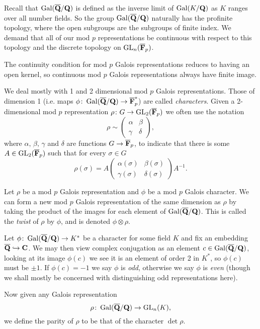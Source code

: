 \documentclass[a4paper,12pt]{article}
\begin{document}
Recall that $\operatorname{Gal}(\overline{\mathbf{Q}}/\mathbf{Q})$ is defined as the inverse limit of $\operatorname{Gal}(K/\mathbf{Q})$ as $K$ ranges over all number fields.
So the group $\operatorname{Gal}(\overline{\mathbf{Q}}/\mathbf{Q})$ naturally has the profinite topology, where the open subgroups are the subgroups of finite index.
We demand that all of our mod $p$ representations be continuous with respect to this topology and the discrete topology on $\operatorname{GL}_n(\overline{\mathbf{F}}_p)$.

\begin{rmk}\label{rmk:ctsfin}
The continuity condition for mod $p$ Galois representations reduces to having an open kernel, so continuous mod $p$ Galois representations always have finite image.
\end{rmk}

We deal mostly with 1 and 2 dimensional mod $p$ Galois representations.
Those of dimension 1 (i.e. maps $\phi\colon\operatorname{Gal}(\overline{\mathbf{Q}}/\mathbf{Q}) \to \overline{\mathbf{F}}_p^*$) are called \emph{characters}.
Given a 2-dimensional mod $p$ representation $\rho\colon G\to \operatorname{GL}_2(\overline{\mathbf{F}}_p)$ we often use the notation
\[
\rho \sim \begin{pmatrix}
\alpha & \beta \\
\gamma & \delta
\end{pmatrix},
\]
where $\alpha,\,\beta,\,\gamma$ and $\delta$ are functions $G \to \overline{\mathbf{F}}_p$, to indicate that there is some $A\in\operatorname{GL}_2(\overline{\mathbf{F}}_p)$ such that for every $\sigma\in G$
\[
\rho(\sigma) = A
 \begin{pmatrix}
\alpha(\sigma) & \beta(\sigma) \\
\gamma(\sigma) & \delta(\sigma)
\end{pmatrix}A^{-1}.
\]

\begin{defn}
Let $\rho$ be a mod $p$ Galois representation and $\phi$ be a mod $p$ Galois character.
We can form a new mod $p$ Galois representation of the same dimension as $\rho$ by taking the product of the images for each element of $\operatorname{Gal}(\overline{\mathbf{Q}}/\mathbf{Q})$.
This is called the \emph{twist} of $\rho$ by $\phi$, and is denoted $\phi\otimes \rho$.
\end{defn}

\begin{defn}
Let $\phi\colon\operatorname{Gal}(\overline{\mathbf{Q}}/\mathbf{Q}) \to K^*$ be a character for some field $K$ and fix an embedding $\overline{\mathbf{Q}}\hookrightarrow \mathbf{C}$.
We may then view complex conjugation as an element $c\in \operatorname{Gal}(\overline{\mathbf{Q}}/\mathbf{Q})$, looking at its image $\phi(c)$ we see it is an element of order 2 in $K^*$, so $\phi(c)$ must be $\pm 1$.
If $\phi(c) = -1$ we say $\phi$ is \emph{odd}, otherwise we say $\phi$ is \emph{even} (though we shall mostly be concerned with distinguishing odd representations here).

Now given any Galois representation
\[
\rho\colon\operatorname{Gal}(\overline{\mathbf{Q}}/\mathbf{Q}) \to \operatorname{GL}_n(K),
\]
we define the parity of $\rho$ to be that of the character $\det\rho$.
\end{defn}
\end{document}
